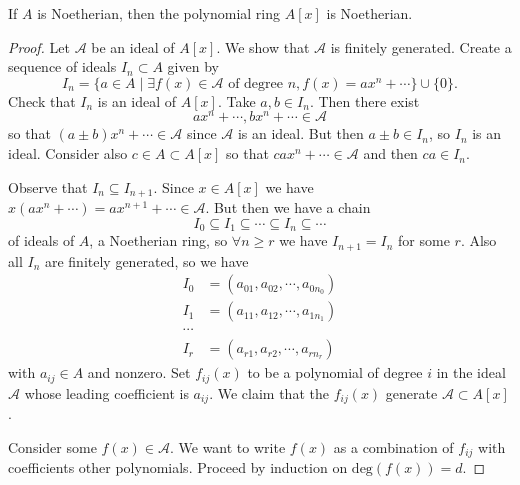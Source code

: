 \begin{theorem}
If $A$ is Noetherian, then the polynomial ring $A[x]$ is Noetherian.
\end{theorem}

\begin{proof}
Let $\mathcal{A}$ be an ideal of $A[x]$. We show that $\mathcal{A}$ is
finitely generated. Create a sequence of ideals $I_n \subset A$ given
by
$$
I_n = \{
         a \in A
      \mid
         \exists f(x) \in \mathcal{A} \text{ of degree } n,
                 f(x) = ax^n + \cdots
      \} \cup \{ 0 \}.
$$
Check that $I_n$ is an ideal of $A[x]$. Take
$a, b \in I_n$. Then there exist
$$
a x^n + \cdots, bx^n + \cdots \in \mathcal{A}
$$
so that $(a \pm b)x^n + \cdots \in \mathcal{A}$ since $\mathcal{A}$ is
an ideal. But then $a \pm b \in I_n$, so $I_n$ is an ideal. Consider
also $c \in A \subset A[x]$ so that $ca x^n + \cdots \in \mathcal{A}$
and then $ca \in I_n$.

Observe that $I_n \subseteq I_{n+1}$. Since $x \in A[x]$ we have
$x (a x^n + \cdots) = a x^{n+1} + \cdots \in \mathcal{A}$. But then
we have a chain
$$
I_0 \subseteq I_1 \subseteq \cdots \subseteq I_n \subseteq \cdots
$$
of ideals of $A$, a Noetherian ring,
so $\forall n \geq r$ we have $I_{n+1} = I_n$ for some $r$.
Also all $I_n$ are finitely generated, so we have
\begin{align*}
I_0 &= (a_{01}, a_{02}, \cdots, a_{0n_0}) \\
I_1 &= (a_{11}, a_{12}, \cdots, a_{1n_1}) \\
\cdots \\
I_r &= (a_{r1}, a_{r2}, \cdots, a_{rn_r})
\end{align*}
with $a_{ij} \in A$ and nonzero. Set
$f_{ij}(x)$ to be a polynomial of degree $i$ in the ideal
$\mathcal{A}$ whose leading coefficient is $a_{ij}$. We claim that
the $f_{ij}(x)$ generate $\mathcal{A} \subset A[x]$.

Consider some $f(x) \in \mathcal{A}$. We want to write
$f(x)$ as a combination of $f_{ij}$ with coefficients other
polynomials. Proceed by induction on $\mathrm{deg}(f(x)) = d$.


\end{proof}
